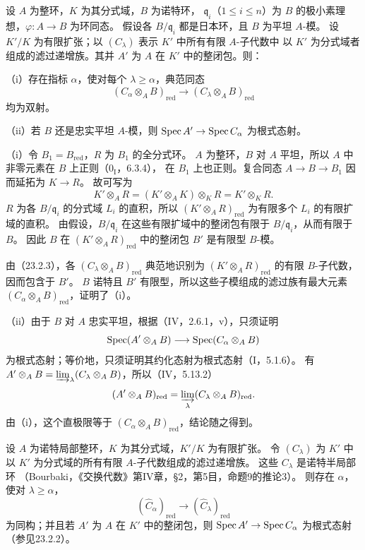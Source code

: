 设 $A$ 为整环，$K$ 为其分式域，$B$ 为诺特环，
$\mathfrak q_i$（$1\le i\le n$）为 $B$ 的极小素理想，$\varphi:A\to B$ 为环同态。
假设各 $B/\mathfrak q_i$ 都是日本环，且 $B$ 为平坦 $A$-模。
设 $K'/K$ 为有限扩张；以 $(C_\lambda)$ 表示 $K'$ 中所有有限 $A$-子代数中
以 $K'$ 为分式域者组成的滤过递增族。其并 $A'$ 为 $A$ 在 $K'$ 中的整闭包。则：

\noindent（i）存在指标 $\alpha$，使对每个 $\lambda\ge\alpha$，典范同态
\begin{equation}
 (C_\alpha\otimes_AB)_{\mathrm{red}}
 \longrightarrow(C_\lambda\otimes_AB)_{\mathrm{red}}
 \tag{23.2.4.1}
\end{equation}
均为双射。

\noindent（ii）若 $B$ 还是忠实平坦 $A$-模，则 $\operatorname{Spec} A'\to\operatorname{Spec} C_\alpha$ 为根式态射。

\eproof
（i）令 $B_1=B_{\mathrm{red}}$，$R$ 为 $B_1$ 的全分式环。
$A$ 为整环，$B$ 对 $A$ 平坦，所以 $A$ 中非零元素在 $B$ 上正则（$0_{\mathrm I}$，6.3.4），
在 $B_1$ 上也正则。复合同态 $A\to B\to B_1$ 因而延拓为 $K\to R$。
故可写为
\[
 K'\otimes_AR=(K'\otimes_AK)\otimes_KR=K'\otimes_KR.
\]
$R$ 为各 $B/\mathfrak q_i$ 的分式域 $L_i$ 的直积，所以
$(K'\otimes_AR)_{\mathrm{red}}$ 为有限多个 $L_i$ 的有限扩域的直积。
由假设，$B/\mathfrak q_i$ 在这些有限扩域中的整闭包有限于 $B/\mathfrak q_i$，从而有限于 $B$。
因此 $B$ 在 $(K'\otimes_AR)_{\mathrm{red}}$ 中的整闭包 $B'$ 是有限型 $B$-模。

由（23.2.3），各 $(C_\lambda\otimes_AB)_{\mathrm{red}}$ 典范地识别为
$(K'\otimes_AR)_{\mathrm{red}}$ 的有限 $B$-子代数，因而包含于 $B'$。
$B$ 诺特且 $B'$ 有限型，所以这些子模组成的滤过族有最大元素
$(C_\alpha\otimes_AB)_{\mathrm{red}}$，证明了（i）。

（ii）由于 $B$ 对 $A$ 忠实平坦，根据（IV，2.6.1，v），只须证明
\[
 \operatorname{Spec}(A'\otimes_AB)\longrightarrow\operatorname{Spec}(C_\alpha\otimes_AB)
\]
为根式态射；等价地，只须证明其约化态射为根式态射（I，5.1.6）。
有 $A'\otimes_AB=\varinjlim_\lambda(C_\lambda\otimes_AB)$，所以（IV，5.13.2）
\[
 (A'\otimes_AB)_{\mathrm{red}}
 =\varinjlim_\lambda(C_\lambda\otimes_AB)_{\mathrm{red}}.
\]
由（i），这个直极限等于 $(C_\alpha\otimes_AB)_{\mathrm{red}}$，结论随之得到。
\finishproof

设 $A$ 为诺特局部整环，$K$ 为其分式域，$K'/K$ 为有限扩张。
令 $(C_\lambda)$ 为 $K'$ 中以 $K'$ 为分式域的所有有限 $A$-子代数组成的滤过递增族。
这些 $C_\lambda$ 是诺特半局部环
（Bourbaki，《交换代数》第IV章，\S2，第5目，命题9的推论3）。
则存在 $\alpha$，使对 $\lambda\ge\alpha$，
\[
 (\widehat C_\alpha)_{\mathrm{red}}
 \longrightarrow(\widehat C_\lambda)_{\mathrm{red}}
\]
为同构；并且若 $A'$ 为 $A$ 在 $K'$ 中的整闭包，则 $\operatorname{Spec} A'\to\operatorname{Spec} C_\alpha$ 为根式态射
（参见23.2.2）。

